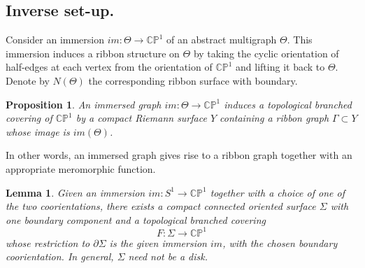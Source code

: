\documentclass[reqno]{amsart}
\newtheorem{proposition}[theorem]{Proposition}
\newtheorem{lemma}[theorem]{Lemma}
\theoremstyle{definition}
\newcommand {\Ga}{\Gamma}
\newcommand {\bCP} {\mathbb {CP}}
\newcommand{\Si}{\Sigma}
\begin{document}
\subsection{Inverse set-up.}
Consider an immersion $im:\Theta\to \bCP^1$ of an abstract multigraph $\Theta$. This immersion induces a ribbon structure on $\Theta$ by taking the cyclic orientation of half-edges at each vertex from the orientation of $\bCP^1$ and lifting it back to $\Theta$. Denote by $N(\Theta)$ the corresponding ribbon surface with boundary.

\begin{proposition}\label{lm1}
An immersed graph $im:\Theta\to \bCP^1$ induces a topological branched covering of $\bCP^1$ by a compact Riemann surface $Y$ containing a ribbon graph $\Ga\subset Y$ whose image is $im(\Theta)$.
\end{proposition}

In other words, an immersed graph gives rise to a ribbon graph together with an appropriate meromorphic function.


\begin{lemma}\label{lm:fill}
Given an immersion $im:S^1\to \bCP^1$ together with a choice of one of the two coorientations, there exists a compact connected oriented surface $\Si$ with one boundary component and a topological branched covering
\[
F:\Si\to \bCP^1
\]
whose restriction to $\partial\Si$ is the given immersion $im$, with the chosen boundary coorientation. In general, $\Si$ need not be a disk.
\end{lemma}
\end{document}
